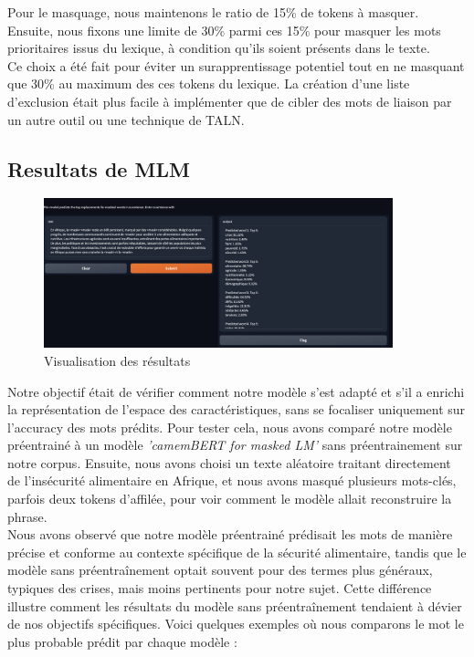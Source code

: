 \documentclass{article}
\begin{document}
Pour le masquage, nous maintenons le ratio de 15\% de tokens à masquer. Ensuite, nous fixons une limite de 30\% parmi ces 15\% pour masquer les mots prioritaires issus du lexique, à condition qu'ils soient présents dans le texte.\\

Ce choix a été fait pour éviter un surapprentissage potentiel tout en ne masquant que  30\% au maximum des ces tokens du lexique. La création d'une liste d'exclusion était plus facile à implémenter que de cibler des mots de liaison par un autre outil ou une technique de TALN.

\subsection{Resultats de MLM}

\begin{figure}[!htbp]
    \centering
    \includegraphics[width=0.9\textwidth]{mlm.png}
    \caption{Visualisation des résultats}
    \label{fig:plots}
\end{figure}

Notre objectif était de vérifier comment notre modèle s’est adapté et s'il a enrichi la représentation de l'espace des caractéristiques, sans se focaliser uniquement sur l'accuracy des mots prédits. Pour tester cela, nous avons comparé notre modèle préentrainé à un modèle \textit{'camemBERT for masked LM'} sans préentrainement sur notre corpus. Ensuite, nous avons choisi un texte aléatoire traitant directement de l'insécurité alimentaire en Afrique, et nous avons masqué plusieurs mots-clés, parfois deux tokens d'affilée, pour voir comment le modèle allait reconstruire la phrase.\\



Nous avons observé que notre modèle préentrainé prédisait les mots de manière précise et conforme au contexte spécifique de la sécurité alimentaire, tandis que le modèle sans préentraînement optait souvent pour des termes plus généraux, typiques des crises, mais moins pertinents pour notre sujet. Cette différence illustre comment les résultats du modèle sans préentraînement tendaient à dévier de nos objectifs spécifiques. Voici quelques exemples où nous comparons le mot le plus probable prédit par chaque modèle :\\
\end{document}
